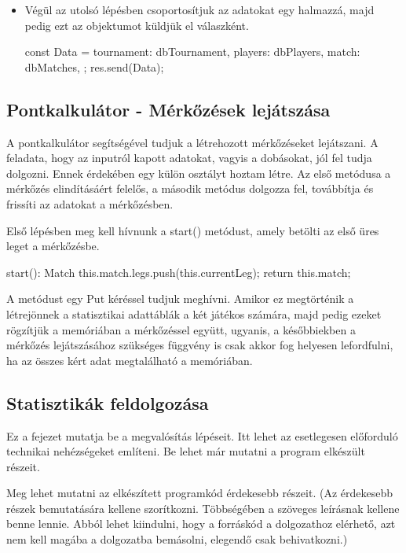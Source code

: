 \begin{itemize}
\begin{cpp}
{      const dbMatch = await NewMatchModel.create(newMatch);
      dbMatches.push(dbMatch);
      console.log("Parsed Match Request:", newMatch);
    }

    console.log("Parsed Tournament Request:", newTournament);
\end{cpp}
\item Végül az utolsó lépésben csoportosítjuk az adatokat egy halmazzá, majd pedig ezt az objektumot küldjük el válaszként.
\begin{cpp}
const Data = {
      tournament: dbTournament,
      players: dbPlayers,
      match: dbMatches,
    };
    res.send(Data);
\end{cpp}
\end{itemize}
\subsection{Pontkalkulátor -  Mérkőzések lejátszása}
A pontkalkulátor segítségével tudjuk a létrehozott mérkőzéseket lejátszani. A feladata, hogy az inputról kapott adatokat, vagyis a dobásokat, jól fel tudja dolgozni. Ennek érdekében egy külön osztályt hoztam létre. Az első metódusa a mérkőzés elindításáért felelős, a második metódus dolgozza fel, továbbítja és frissíti az adatokat a mérkőzésben.

Első lépésben meg kell hívnunk a start() metódust, amely betölti az első üres leget a mérkőzésbe.
\begin{cpp}
  start(): Match {
    this.match.legs.push(this.currentLeg);
    return this.match;
  }
\end{cpp}

A metódust egy Put kéréssel tudjuk meghívni. Amikor ez megtörténik a létrejönnek a statisztikai adattáblák a két játékos számára, majd pedig ezeket rögzítjük a memóriában a mérkőzéssel együtt, ugyanis, a későbbiekben a mérkőzés lejátszásához szükséges függvény is csak akkor fog helyesen lefordfulni, ha az összes kért adat megtalálható a memóriában. 
\subsection{Statisztikák feldolgozása}
Ez a fejezet mutatja be a megvalósítás lépéseit.
Itt lehet az esetlegesen előforduló technikai nehézségeket említeni.
Be lehet már mutatni a program elkészült részeit.

Meg lehet mutatni az elkészített programkód érdekesebb részeit.
(Az érdekesebb részek bemutatására kellene szorítkozni.
Többségében a szöveges leírásnak kellene benne lennie.
Abból lehet kiindulni, hogy a forráskód a dolgozathoz elérhető, azt nem kell magába a dolgozatba bemásolni, elegendő csak behivatkozni.)

